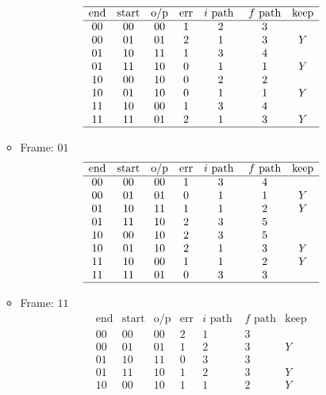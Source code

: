 \documentclass[main.tex]{subfiles}
\begin{document}
\begin{itemize}
\begin{itemize}
    \[
    \begin{array}{ccccccc}
      \hline
      \text{end} & \text{start} & \text{o/p} & \text{err} & i \text{ path } & f \text{ path} & \text{keep}\\
      \hline
      00 & 00 & 00 & 1 & 2 & 3 & \\
      00 & 01 & 01 & 2 & 1 & 3 & Y\\
      01 & 10 & 11 & 1 & 3 & 4 & \\
      01 & 11 & 10 & 0 & 1 & 1 & Y\\
      10 & 00 & 10 & 0 & 2 & 2 & \\
      10 & 01 & 10 & 0 & 1 & 1 & Y\\
      11 & 10 & 00 & 1 & 3 & 4 & \\
      11 & 11 & 01 & 2 & 1 & 3 & Y\\
      \hline
    \end{array}
    \]
  \item Frame: $01$
    \[
    \begin{array}{ccccccc}
      \hline
      \text{end} & \text{start} & \text{o/p} & \text{err} & i \text{ path } & f \text{ path} & \text{keep}\\
      \hline
      00 & 00 & 00 & 1 & 3 & 4 & \\
      00 & 01 & 01 & 0 & 1 & 1 & Y\\
      01 & 10 & 11 & 1 & 1 & 2 & Y\\
      01 & 11 & 10 & 2 & 3 & 5 & \\
      10 & 00 & 10 & 2 & 3 & 5 & \\
      10 & 01 & 10 & 2 & 1 & 3 & Y\\
      11 & 10 & 00 & 1 & 1 & 2 & Y\\
      11 & 11 & 01 & 0 & 3 & 3 & \\
      \hline
    \end{array}
    \]
  \item Frame: $11$
    \[
    \begin{array}{ccccccc}
      \hline
      \text{end} & \text{start} & \text{o/p} & \text{err} & i \text{ path } & f \text{ path} & \text{keep}\\
      \hline
      00 & 00 & 00 & 2 & 1 & 3 & \\
      00 & 01 & 01 & 1 & 2 & 3 & Y\\
      01 & 10 & 11 & 0 & 3 & 3 & \\
      01 & 11 & 10 & 1 & 2 & 3 & Y\\
      10 & 00 & 10 & 1 & 1 & 2 & Y\\

\end{array}\]
\end{itemize}
\end{itemize}
\end{document}
